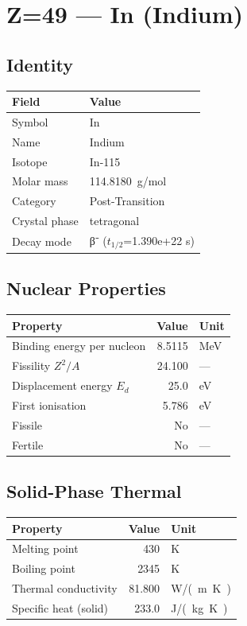 \documentclass[11pt,a4paper]{article}
\begin{document}
\newpage

\section{Z=49 --- In (Indium)}
\label{sec:Z49}

\subsection{Identity}
\begin{tabular}{ll}
  \toprule
  Field & Value \\
  \midrule
  Symbol & In \\
  Name & Indium \\
  Isotope & In-115 \\
  Molar mass & \SI{114.8180}{g/mol} \\
  Category & Post-Transition \\
  Crystal phase & tetragonal \\
  Decay mode & β⁻ ($t_{1/2}$=1.390e+22 s) \\
  \bottomrule
\end{tabular}

\subsection{Nuclear Properties}
\begin{tabular}{lrl}
  \toprule
  Property & Value & Unit \\
  \midrule
  Binding energy per nucleon & 8.5115 & \si{MeV} \\
  Fissility $Z^2/A$ & 24.100 & --- \\
  Displacement energy $E_d$ & 25.0 & \si{eV} \\
  First ionisation & 5.786 & \si{eV} \\
  Fissile & No & --- \\
  Fertile & No & --- \\
  \bottomrule
\end{tabular}

\subsection{Solid-Phase Thermal}
\begin{tabular}{lrl}
  \toprule
  Property & Value & Unit \\
  \midrule
  Melting point & 430 & \si{K} \\
  Boiling point & 2345 & \si{K} \\
  Thermal conductivity & 81.800 & \si{W/(m.K)} \\
  Specific heat (solid) & 233.0 & \si{J/(kg.K)} \\
  \bottomrule
\end{tabular}
\end{document}
